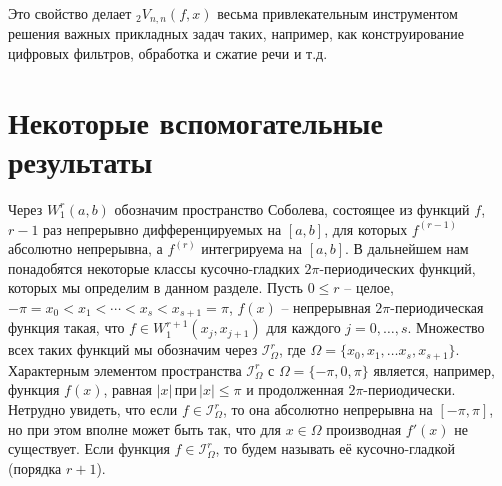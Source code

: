 Это свойство делает $_2V_{n,n}(f,x)$ весьма привлекательным инструментом решения важных прикладных задач таких, например, как конструирование цифровых фильтров, обработка и сжатие речи и т.д.

\section{Некоторые вспомогательные результаты}\label{s2}
Через $W_1^r(a,b)$ обозначим пространство Соболева, состоящее из функций $f$, $r-1$ раз непрерывно дифференцируемых на $[a,b]$, для которых $f^{(r-1)}$ абсолютно непрерывна, а $f^{(r)}$ интегрируема на $[a,b]$. В дальнейшем нам понадобятся некоторые классы кусочно-гладких \linebreak $2\pi$-периодических функций, которых мы определим в данном разделе. Пусть $0\le r$ -- целое, $-\pi=x_0<x_1<\cdots<x_s<x_{s+1}=\pi$, $f(x)$ -- непрерывная $2\pi$-периодическая функция такая, что $f\in W_1^{r+1}(x_j,x_{j+1})$ для каждого $j=0,\ldots,s$. Множество всех таких функций мы обозначим  через $\mathcal{ I}^r_\Omega$, где $\Omega=\{x_0,x_1,\ldots x_s,x_{s+1}\}$.
 Характерным элементом пространства $\mathcal{ I}^r_\Omega$   с $\Omega=\{-\pi,0,\pi\}$ является, например, функция   $f(x)$, равная $|x|\,\text{при}\, |x|\le \pi$ и продолженная $2\pi$-периодически.
Нетрудно увидеть, что если $f\in  \mathcal{ I}^r_\Omega$, то она абсолютно непрерывна на $[-\pi,\pi]$, но при этом вполне может быть так, что для  $x\in\Omega$ производная $f'(x)$  не существует. Если функция $f\in \mathcal{ I}^r_\Omega$, то будем называть её кусочно-гладкой (порядка $r+1$).

